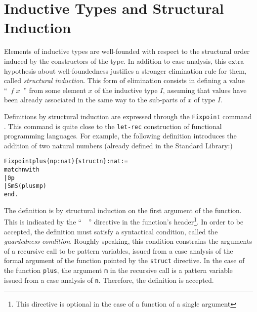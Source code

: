 \documentclass[11pt]{article}
\newcommand{\refmancite}[1]{{}}
\begin{document}


\section{Inductive Types and Structural Induction}
\label{StructuralInduction}

Elements of inductive types  are well-founded with
respect to the structural order induced by the constructors of the
type. In addition to case analysis, this extra hypothesis about
well-foundedness justifies a stronger elimination rule for them, called
\textsl{structural induction}.  This form of elimination consists in
defining a value ``~$f\;x$~'' from some element $x$ of the inductive type
$I$, assuming that values have been already associated in the same way
to the sub-parts of $x$ of type $I$.


Definitions by structural induction are expressed through the
\texttt{Fixpoint} command \refmancite{Section
\ref{Fixpoint}}. This command is quite close to the
\texttt{let-rec} construction of functional programming languages.
For example, the following definition introduces the addition of two
natural numbers (already defined in the Standard Library:)

\begin{alltt}
Fixpoint plus (n p:nat) \{struct n\} : nat :=
  match n with
          | 0 {\funarrow} p
          | S m {\funarrow} S (plus m p)
 end.
\end{alltt}

The definition is by structural induction on the first argument of the
function. This is indicated  by the ``~~''
directive in the function's header\footnote{This directive is optional
in the case of a function of a single argument}.
  In
order to be accepted, the definition must satisfy a syntactical
condition, called the \textsl{guardedness condition}. Roughly
speaking, this condition constrains the arguments of a recursive call
to be pattern variables, issued from a case analysis of the formal
argument of the function pointed by the \texttt{struct} directive.
 In the case of the
function \texttt{plus}, the argument \texttt{m} in the recursive call is a
pattern variable issued from a case analysis of \texttt{n}. Therefore, the
definition is accepted.
\end{document}
